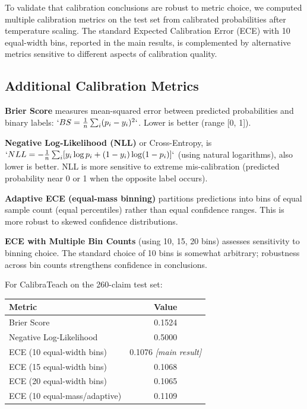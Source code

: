 To validate that calibration conclusions are robust to metric choice, we computed multiple calibration metrics on the test set from calibrated probabilities after temperature scaling. The standard Expected Calibration Error (ECE) with 10 equal-width bins, reported in the main results, is complemented by alternative metrics sensitive to different aspects of calibration quality.

\subsection{Additional Calibration Metrics}\label{additional-calibration-metrics}

\textbf{Brier Score} measures mean-squared error between predicted probabilities and binary labels: \(`BS = \frac{1}{n} \sum_i (p_i - y_i)^2`\). Lower is better (range {[}0, 1{]}).

\textbf{Negative Log-Likelihood (NLL)} or Cross-Entropy, is \(`NLL = -\frac{1}{n} \sum_i [y_i \log p_i + (1-y_i) \log(1-p_i)]`\) (using natural logarithms), also lower is better. NLL is more sensitive to extreme mis-calibration (predicted probability near 0 or 1 when the opposite label occurs).

\textbf{Adaptive ECE (equal-mass binning)} partitions predictions into bins of equal sample count (equal percentiles) rather than equal confidence ranges. This is more robust to skewed confidence distributions.

\textbf{ECE with Multiple Bin Counts} (using 10, 15, 20 bins) assesses sensitivity to binning choice. The standard choice of 10 bins is somewhat arbitrary; robustness across bin counts strengthens confidence in conclusions.

For CalibraTeach on the 260-claim test set:

\protect{}\label{tab:calib_robustness}
{\def\LTcaptype{none} %
\begin{longtable}[]{@{}lc@{}}
\toprule\noalign{}
\textbf{Metric} & \textbf{Value} \\
\midrule\noalign{}
\endhead
\bottomrule\noalign{}
\endlastfoot
Brier Score & 0.1524 \\
Negative Log-Likelihood & 0.5000 \\
ECE (10 equal-width bins) & 0.1076 \emph{{[}main result{]}} \\
ECE (15 equal-width bins) & 0.1068 \\
ECE (20 equal-width bins) & 0.1065 \\
ECE (10 equal-mass/adaptive) & 0.1109 \\
\end{longtable}
}

